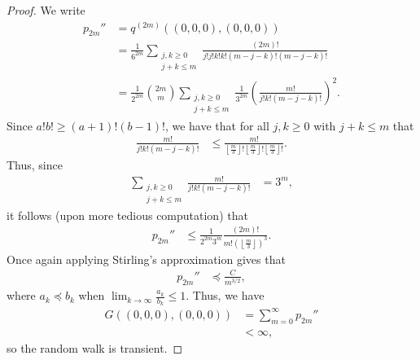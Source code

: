 \documentclass[10pt]{mypackage}
\begin{document}
\begin{proof}
  We write
  \begin{align*}
    p_{2m}'' &= q^{(2m)}\left( \left( 0,0,0 \right),\left( 0,0,0 \right) \right)\\
             &= \frac{1}{6^{2m}} \sum_{\substack{j,k\geq 0\\ j+k\leq m}} \frac{\left( 2m \right)!}{j!j!k!k!\left( m-j-k \right)!\left( m-j-k \right)!}\\
             &= \frac{1}{2^{2m}}{2m\choose m} \sum_{\substack{j,k\geq 0\\j+k\leq m}} \frac{1}{3^{2m}}\left( \frac{m!}{j!k!\left( m-j-k \right)!} \right)^2.
  \end{align*}
  Since $a!b! \geq \left( a+1 \right)!\left( b-1 \right)!$, we have that for all $j,k\geq 0$ with $j+k\leq m$ that
  \begin{align*}
    \frac{m!}{j!k!\left( m-j-k \right)!} &\leq \frac{m!}{\left\lfloor \frac{m}{3}\right\rfloor!\left\lfloor \frac{m}{3}\right\rfloor!\left\lfloor \frac{m}{3}\right\rfloor!}.
  \end{align*}
  Thus, since
  \begin{align*}
    \sum_{\substack{j,k\geq 0\\j+k\leq m}} \frac{m!}{j!k!\left( m-j-k \right)!} &= 3^{m},
  \end{align*}
  it follows (upon more tedious computation) that
  \begin{align*}
    p_{2m}'' &\leq \frac{1}{2^{2m}3^{m}} \frac{\left( 2m \right)!}{m!\left( \left\lfloor \frac{m}{3}\right\rfloor \right)^3}.
  \end{align*}
  Once again applying Stirling's approximation gives that
  \begin{align*}
    p_{2m}'' &\preceq \frac{C}{m^{3/2}},
  \end{align*}
  where $a_k\preceq b_k$ when $\lim_{k\to\infty}\frac{a_k}{b_k}\leq 1$. Thus, we have
  \begin{align*}
    G\left( \left( 0,0,0 \right),\left( 0,0,0 \right) \right) &= \sum_{m=0}^{\infty}p_{2m}''\\
                                                              &< \infty,
  \end{align*}
  so the random walk is transient.
\end{proof}
\end{document}
